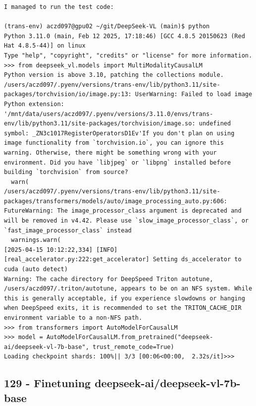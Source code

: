 \begin{verbatim}
I managed to run the test code:

(trans-env) aczd097@gpu02 ~/git/DeepSeek-VL (main)$ python
Python 3.11.0 (main, Feb 12 2025, 17:18:46) [GCC 4.8.5 20150623 (Red Hat 4.8.5-44)] on linux
Type "help", "copyright", "credits" or "license" for more information.
>>> from deepseek_vl.models import MultiModalityCausalLM
Python version is above 3.10, patching the collections module.
/users/aczd097/.pyenv/versions/trans-env/lib/python3.11/site-packages/torchvision/io/image.py:13: UserWarning: Failed to load image Python extension: '/mnt/data/users/aczd097/.pyenv/versions/3.11.0/envs/trans-env/lib/python3.11/site-packages/torchvision/image.so: undefined symbol: _ZN3c1017RegisterOperatorsD1Ev'If you don't plan on using image functionality from `torchvision.io`, you can ignore this warning. Otherwise, there might be something wrong with your environment. Did you have `libjpeg` or `libpng` installed before building `torchvision` from source?
  warn(
/users/aczd097/.pyenv/versions/trans-env/lib/python3.11/site-packages/transformers/models/auto/image_processing_auto.py:606: FutureWarning: The image_processor_class argument is deprecated and will be removed in v4.42. Please use `slow_image_processor_class`, or `fast_image_processor_class` instead
  warnings.warn(
[2025-04-15 10:12:22,334] [INFO] [real_accelerator.py:222:get_accelerator] Setting ds_accelerator to cuda (auto detect)
Warning: The cache directory for DeepSpeed Triton autotune, /users/aczd097/.triton/autotune, appears to be on an NFS system. While this is generally acceptable, if you experience slowdowns or hanging when DeepSpeed exits, it is recommended to set the TRITON_CACHE_DIR environment variable to a non-NFS path.
>>> from transformers import AutoModelForCausalLM
>>> model = AutoModelForCausalLM.from_pretrained("deepseek-ai/deepseek-vl-7b-base", trust_remote_code=True)
Loading checkpoint shards: 100%|| 3/3 [00:06<00:00,  2.32s/it]>>>

\end{verbatim}


\subsection{129 - Finetuning deepseek-ai/deepseek-vl-7b-base}
\label{app_res:129}

